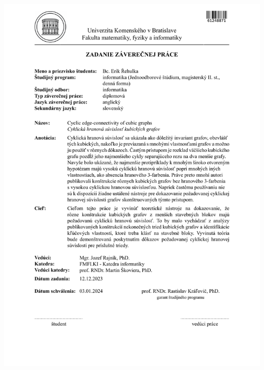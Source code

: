 \documentclass[12pt, twoside]{book}
\begin{document}
\newpage
\thispagestyle{empty}

\noindent
\includegraphics[trim=2.5cm 5cm 2.5cm 0,width=\textwidth]{images/assignment-sk.pdf}

\ifenglish{}
    \newpage
    \thispagestyle{empty}
\end{document}
